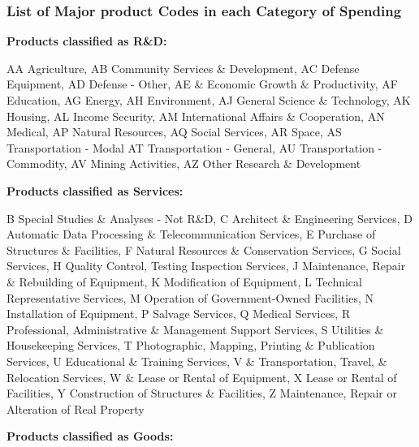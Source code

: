 \documentclass[dv_diss_main.tex]{subfiles}
\begin{document}
\subsubsection{List of Major product Codes in each Category of Spending}\label{tab:cat_list}


\textbf{Products classified as R\&D: }

AA Agriculture, AB Community Services \& Development, AC Defense Equipment, AD Defense - Other, AE & Economic Growth \& Productivity, AF Education, AG Energy, AH Environment, AJ  General Science \& Technology, AK Housing, AL Income Security, AM International Affairs \& Cooperation,
AN Medical, AP Natural Resources, AQ Social Services, AR Space, AS Transportation - Modal AT Transportation - General, AU  Transportation - Commodity, AV  Mining Activities, AZ  Other Research \& Development

\bigskip
\newline
\vspace{4}
\textbf{Products classified as Services:}

B Special Studies \& Analyses - Not R\&D, C Architect \& Engineering Services, D  Automatic Data Processing \& Telecommunication Services, E  Purchase of Structures \& Facilities, F Natural Resources \& Conservation Services, G Social Services, H Quality Control, Testing Inspection Services, J Maintenance, Repair \& Rebuilding of Equipment, K Modification of Equipment, L Technical Representative Services, M Operation of Government-Owned Facilities, N Installation of Equipment, P Salvage Services, Q  Medical Services, R Professional, Administrative \& Management Support Services, S Utilities \& Housekeeping Services, T  Photographic, Mapping, Printing \& Publication Services, U  Educational \& Training Services, V & Transportation, Travel, \& Relocation Services, W \& Lease or Rental of Equipment, X  Lease or Rental of Facilities, Y  Construction of Structures \& Facilities, Z  Maintenance, Repair or Alteration of Real Property

\newline
\bigskip
\textbf{Products classified as Goods: }
\end{document}
